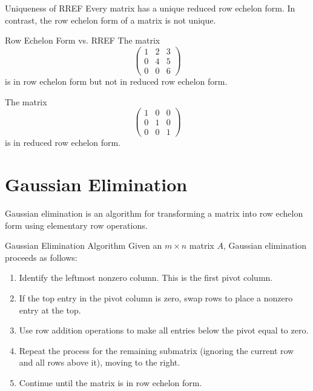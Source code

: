 \documentclass[12pt,a4paper]{article}
\begin{document}
	\begin{remark}{Uniqueness of RREF}
		Every matrix has a unique reduced row echelon form. In contrast, the row echelon form of a matrix is not unique.
	\end{remark}
	
	\begin{example}{Row Echelon Form vs. RREF}
		The matrix
		\[
		\begin{pmatrix} 1 & 2 & 3 \\ 0 & 4 & 5 \\ 0 & 0 & 6 \end{pmatrix}
		\]
		is in row echelon form but not in reduced row echelon form.
		
		The matrix
		\[
		\begin{pmatrix} 1 & 0 & 0 \\ 0 & 1 & 0 \\ 0 & 0 & 1 \end{pmatrix}
		\]
		is in reduced row echelon form.
	\end{example}
	
	\section{Gaussian Elimination}
	
	Gaussian elimination is an algorithm for transforming a matrix into row echelon form using elementary row operations.
	
	\begin{definition}{Gaussian Elimination Algorithm}
		Given an $m \times n$ matrix $A$, Gaussian elimination proceeds as follows:
		\begin{enumerate}
			\item Identify the leftmost nonzero column. This is the first pivot column.
			\item If the top entry in the pivot column is zero, swap rows to place a nonzero entry at the top.
			\item Use row addition operations to make all entries below the pivot equal to zero.
			\item Repeat the process for the remaining submatrix (ignoring the current row and all rows above it), moving to the right.
			\item Continue until the matrix is in row echelon form.
		\end{enumerate}
	\end{definition}
	
\end{document}
